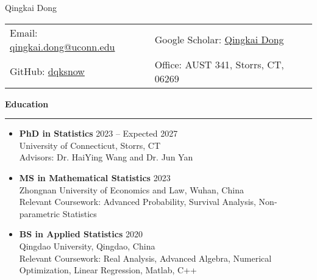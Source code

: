 \documentclass[a4paper,10pt]{article}
\newcommand{\resheading}[1]{
  \vspace{8pt}
  \noindent\textbf{\large #1}
  \vspace{4pt}
  \hrule
  \vspace{8pt}
}
\begin{document}
\begin{center}
    {\LARGE Qingkai Dong} \\
    \vspace{5pt}
    \begin{tabular}{ll}
      Email: \href{mailto:qingkai.dong@uconn.edu}{qingkai.dong@uconn.edu} &  Google Scholar: \href{https://scholar.google.com/citations?user=mojHlF4AAAAJ&hl=en&oi=ao}{Qingkai Dong} \\  GitHub: \href{https://github.com/dqksnow}{dqksnow} 
      &   Office: AUST 341, Storrs, CT, 06269 \\
    \end{tabular}
  \end{center}
  
\resheading{Education}
\begin{itemize}[left=0pt, label={}]
    \item \textbf{PhD in Statistics} \hfill 2023 -- Expected 2027 \\
    University of Connecticut, Storrs, CT \\
    Advisors: Dr. HaiYing Wang and Dr. Jun Yan
    
    \item \textbf{MS in Mathematical Statistics} \hfill 2023 \\
    Zhongnan University of Economics and Law, Wuhan, China \\
    Relevant Coursework: Advanced Probability, Survival Analysis, Non-parametric Statistics
    
    \item \textbf{BS in Applied Statistics} \hfill 2020 \\
    Qingdao University, Qingdao, China \\
    Relevant Coursework: Real Analysis, Advanced Algebra, Numerical
Optimization, Linear Regression, Matlab, C++
\end{itemize}
\end{document}
